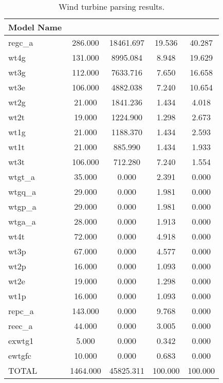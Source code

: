 \begin{table}[!ht]
	\centering
	\begin{tabular}{@{} C{2cm} 
	S[table-format=4.2,round-mode=places, round-precision=2,] 
	S[table-format=6.2,round-mode=places, round-precision=2] 
	S[table-format=3.2,round-mode=places, round-precision=2]
 	S[table-format=3.2,round-mode=places, round-precision=2] @{}} 	
		\toprule %
		\footnotesize %
		\raggedright %
Model Name & 	  & 	  & 			&		\\ \midrule
regc\_a & 	286.000 & 	18461.697 & 	19.536 & 	40.287 \\
wt4g & 	131.000 & 	8995.084 & 	8.948 & 	19.629 \\
wt3g & 	112.000 & 	7633.716 & 	7.650 & 	16.658 \\
wt3e & 	106.000 & 	4882.038 & 	7.240 & 	10.654 \\
wt2g & 	21.000 & 	1841.236 & 	1.434 & 	4.018 \\
wt2t & 	19.000 & 	1224.900 & 	1.298 & 	2.673 \\
wt1g & 	21.000 & 	1188.370 & 	1.434 & 	2.593 \\
wt1t & 	21.000 & 	885.990 & 	1.434 & 	1.933 \\
wt3t & 	106.000 & 	712.280 & 	7.240 & 	1.554 \\
wtgt\_a & 	35.000 & 	0.000 & 	2.391 & 	0.000 \\
wtgq\_a & 	29.000 & 	0.000 & 	1.981 & 	0.000 \\
wtgp\_a & 	29.000 & 	0.000 & 	1.981 & 	0.000 \\
wtga\_a & 	28.000 & 	0.000 & 	1.913 & 	0.000 \\
wt4t & 	72.000 & 	0.000 & 	4.918 & 	0.000 \\
wt3p & 	67.000 & 	0.000 & 	4.577 & 	0.000 \\
wt2p & 	16.000 & 	0.000 & 	1.093 & 	0.000 \\
wt2e & 	19.000 & 	0.000 & 	1.298 & 	0.000 \\
wt1p & 	16.000 & 	0.000 & 	1.093 & 	0.000 \\
repc\_a & 	143.000 & 	0.000 & 	9.768 & 	0.000 \\
reec\_a & 	44.000 & 	0.000 & 	3.005 & 	0.000 \\
exwtg1 & 	5.000 & 	0.000 & 	0.342 & 	0.000 \\
ewtgfc & 	10.000 & 	0.000 & 	0.683 & 	0.000 \\ \midrule
TOTAL & 	1464.000 & 	45825.311 & 	100.000 & 	100.000 \\
		\bottomrule
	\end{tabular}
	\caption{Wind turbine parsing results.}
	\label{tab: dydParse wind turbines }
\end{table}